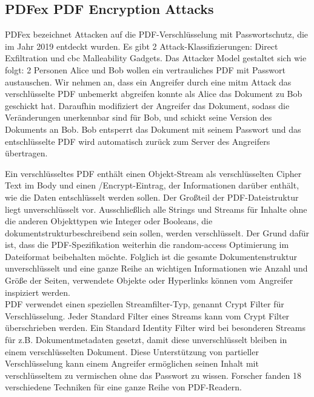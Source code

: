 \subsection{PDFex PDF Encryption Attacks}
PDFex bezeichnet Attacken auf die PDF-Verschlüsselung mit Passwortschutz, die im Jahr 2019 entdeckt wurden. Es gibt 2 Attack-Klassifizierungen: Direct Exfiltration und \gls{cbc} Malleability Gadgets.
Das Attacker Model gestaltet sich wie folgt: 2 Personen Alice und Bob wollen ein vertrauliches PDF mit Passwort austauschen. Wir nehmen an, dass ein Angreifer durch eine \gls{mitm} Attack das verschlüsselte PDF unbemerkt abgreifen konnte als Alice das Dokument zu Bob geschickt hat. Daraufhin modifiziert der Angreifer das Dokument, sodass die Veränderungen unerkennbar sind für Bob, und schickt seine Version des Dokuments an Bob. Bob entsperrt das Dokument mit seinem Passwort und das entschlüsselte PDF wird automatisch zurück zum Server des Angreifers übertragen. \cite{ccc-break-pdf}
\par
Ein verschlüsseltes PDF enthält einen Objekt-Stream als verschlüsselten Cipher Text im Body und einen /Encrypt-Eintrag, der Informationen darüber enthält, wie die Daten entschlüsselt werden sollen. Der Großteil der PDF-Dateistruktur liegt unverschlüsselt vor. Ausschließlich alle Strings und Streams für Inhalte ohne die anderen Objekttypen wie Integer oder Booleans, die dokumentstrukturbeschreibend sein sollen, werden verschlüsselt. Der Grund dafür ist, dass die PDF-Spezifikation weiterhin die random-access Optimierung im Dateiformat beibehalten möchte. Folglich ist die gesamte Dokumentenstruktur unverschlüsselt und eine ganze Reihe an wichtigen Informationen wie Anzahl und Größe der Seiten, verwendete Objekte oder Hyperlinks können vom Angreifer inspiziert werden. \\
PDF verwendet einen speziellen Streamfilter-Typ, genannt Crypt Filter für Verschlüsselung. Jeder Standard Filter eines Streams kann vom Crypt Filter überschrieben werden. Ein Standard Identity Filter wird bei besonderen Streams für z.B. Dokumentmetadaten gesetzt, damit diese unverschlüsselt bleiben in einem verschlüsselten Dokument. Diese Unterstützung von partieller Verschlüsselung kann einem Angreifer ermöglichen seinen Inhalt mit verschlüsseltem zu vermischen ohne das Passwort zu wissen. Forscher fanden 18 verschiedene Techniken für eine ganze Reihe von PDF-Readern. \cite{ccc-break-pdf}
\par
